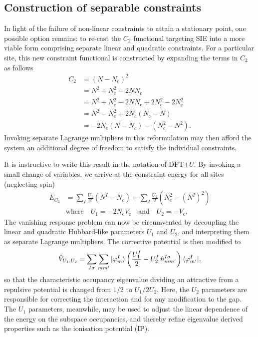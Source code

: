 \subsection{Construction of separable constraints}
\label{sec:two_constraints}

In light of the failure of non-linear constraints 
to attain a stationary point, 
one possible option remains: 
to re-cast the $C_2$ functional targeting SIE  
into a more viable form 
comprising separate linear and quadratic constraints.
%
For a particular site, 
this new constraint functional is constructed 
by expanding the terms in $C_2$ as follows
%
\begin{align}
C_2&=(N-N_\textrm{c})^2\nonumber \\
&=N^2+N_\textrm{c}^2-2NN_\textrm{c}\nonumber\\
&=N^2+N_\textrm{c}^2-2NN_\textrm{c}+2N_\textrm{c}^2-2N_\textrm{c}^2\nonumber\\
&=N^2-N_\textrm{c}^2+2N_\textrm{c}(N_\textrm{c}-N)\nonumber\\
&=-2N_\textrm{c}(N-N_\textrm{c})-(N_\textrm{c}^2-N^2).
\end{align}
%
Invoking separate Lagrange multipliers 
in this reformulation 
may then afford the system 
an additional degree of freedom 
to satisfy the individual constraints.

It is instructive to write this result 
in the notation of DFT+$U$.
%
By invoking a small  change of variables, 
we arrive at the constraint energy 
for all sites (neglecting spin)
%
\begin{align}
E_{C_2}&=\sum_{I} \frac{U_1}{2} \left(N^I-N_\textrm{c}\right) 
 + \sum_{I} \frac{U_2}{2} \left(N^{ 2}_\textrm{c}- \left(N^{I}\right)^{2}\right)\nonumber \\[0.5em]
& \mbox{where}\quad
 U_1=-2N_\textrm{c}V_\textrm{c}
 \quad\mbox{and}\quad
 U_2=-V_\textrm{c}.
\label{eq:dft+nu}
\end{align}
%
The vanishing response problem
can now be circumvented by 
decoupling the linear and quadratic
Hubbard-like parameters 
$U_1$ and $U_2$, 
and interpreting them 
as separate Lagrange multipliers.
%
The corrective potential is then modified to 
%
\begin{equation}
\hat{V}_{U_1,U_2}=\sum_{I\sigma}\sum_{mm'}\vert\varphi^I_m\rangle\left(\frac{U_1^I}{2}-U_2^I\,\hat{n}^{I\sigma}_{mm'}\right)\langle\varphi^I_{m'}\vert, 
\label{eq:corrective_potential}
\end{equation}
%
so that the characteristic occupancy eigenvalue
dividing an attractive from a repulsive  potential 
is changed from $1/2$ to $U_1/ 2 U_2 $.
%
Here, the $U_2$ parameters are responsible 
for correcting the interaction  
and for any modification to the gap.
%
The $U_1$ parameters, meanwhile, 
may be used to adjust 
the linear dependence of the energy
on the subspace occupancies, 
and thereby refine eigenvalue derived
properties such as the ionisation potential (IP).


